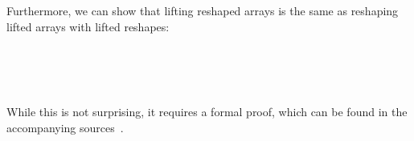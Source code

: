 Furthermore, we can show that lifting reshaped arrays is the same as
reshaping lifted arrays with lifted reshapes:
\begin{code}%
%
\>[2]%
\>[15]\AgdaSymbol{:}\AgdaSpace{}%
\AgdaSymbol{(}\AgdaSpace{}%
\AgdaSymbol{:}\AgdaSpace{}%
\AgdaSpace{}%
\AgdaSpace{}%
\AgdaSymbol{)}\AgdaSpace{}%
\AgdaSymbol{(}\AgdaSpace{}%
\AgdaSymbol{:}\AgdaSpace{}%
\AgdaSpace{}%
\AgdaSpace{}%
\AgdaSymbol{)}\<%
\\
%
\>[15]\AgdaSpace{}%
\AgdaSpace{}%
\AgdaSpace{}%
\AgdaSpace{}%
\AgdaSpace{}%
\AgdaSpace{}%
\AgdaSpace{}%
\AgdaSpace{}%
\AgdaSpace{}%
\AgdaSpace{}%
\AgdaSpace{}%
\AgdaSpace{}%
\AgdaSpace{}%
\<%
\\
%
\>[2]%
\>[15]\AgdaSymbol{:}\AgdaSpace{}%
\AgdaSymbol{(}\AgdaSpace{}%
\AgdaSymbol{:}\AgdaSpace{}%
\AgdaSpace{}%
\AgdaSpace{}%
\AgdaSymbol{)}\AgdaSpace{}%
\AgdaSymbol{(}\AgdaSpace{}%
\AgdaSymbol{:}\AgdaSpace{}%
\AgdaSpace{}%
\AgdaSpace{}%
\AgdaSpace{}%
\AgdaSpace{}%
\AgdaSymbol{)}\<%
\\
%
\>[15]\AgdaSpace{}%
\AgdaSpace{}%
\AgdaSpace{}%
\AgdaSpace{}%
\AgdaSpace{}%
\AgdaSpace{}%
\AgdaSpace{}%
\AgdaSpace{}%
\AgdaSpace{}%
\AgdaSpace{}%
\AgdaSpace{}%
\AgdaSpace{}%
\AgdaSpace{}%
\<%
\end{code}
While this is not surprising, it requires a formal proof, which can be found
in the accompanying sources~\citep{paper-src}.

